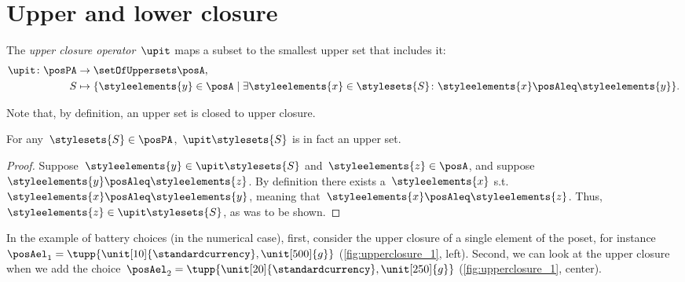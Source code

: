 
\section[Antichains]{Upper and lower closure}

\begin{definition}
	\label{def:upperclosure}
	The \emph{upper closure operator}~$\upit $ maps a subset to the smallest upper set that includes it:
	\begin{equation}
		\begin{aligned}
			\upit  \colon \posPA & \to \setOfUppersets\posA,                                                                                                                  \\
			S                    & \mapsto \{\styleelements{y}\in \posA \mid \exists \styleelements{x}\in \stylesets{S} \colon \styleelements{x}\posAleq \styleelements{y}\}.
		\end{aligned}
	\end{equation}
\end{definition}
\begin{remark}
	Note that, by definition, an upper set is closed to upper closure.
\end{remark}
\begin{lemma}
	For any~$\stylesets{S}\in \posPA$,~$\upit  \stylesets{S}$ is in fact an upper set.
\end{lemma}
\begin{proof}
	Suppose~$\styleelements{y}\in \upit  \stylesets{S}$ and~$\styleelements{z}\in \posA$, and suppose $\styleelements{y}\posAleq \styleelements{z}$.
	By definition there exists a~$\styleelements{x}$ s.t.~$\styleelements{x}\posAleq \styleelements{y}$, meaning that~$\styleelements{x}\posAleq \styleelements{z}$.
	Thus,~$\styleelements{z}\in \upit  \stylesets{S}$, as was to be shown.
\end{proof}

In the example of battery choices (in the numerical case), first, consider the upper closure of a single element of the poset, for instance~$\posAel_1=\tupp{\unit[10]{\standardcurrency},\unit[500]{g}}$ (\cref{fig:upperclosure_1}, left).
Second, we can look at the upper closure when we add the choice~$\posAel_2=\tupp{\unit[20]{\standardcurrency},\unit[250]{g}}$ (\cref{fig:upperclosure_1}, center).

